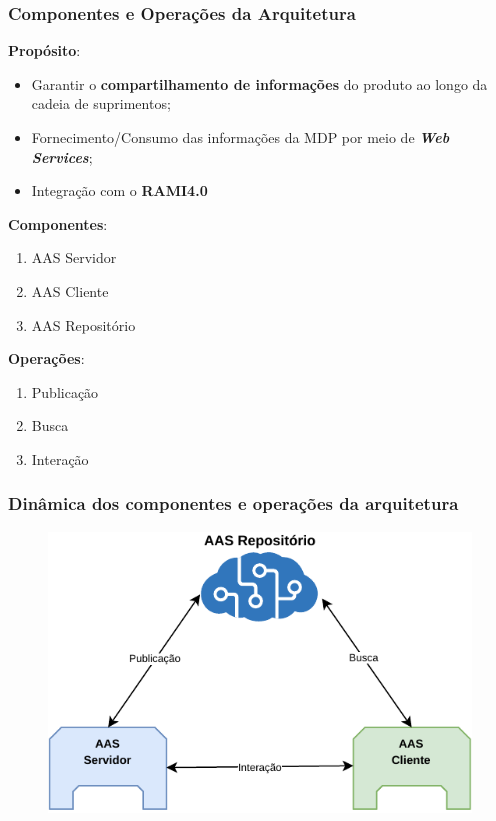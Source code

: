 \documentclass[10pt]{beamer}
\begin{document}
\begin{frame}
	\frametitle{Componentes e Operações da Arquitetura}
	
	\textbf{Propósito}:
	
	\begin{itemize}
		\item Garantir o \textbf{compartilhamento de informações} do produto ao longo da cadeia de suprimentos;
		\item Fornecimento/Consumo das informações da MDP por meio de \textit{\textbf{Web Services}};
		\item Integração com o \textbf{RAMI4.0}
	\end{itemize}

	\bigskip

	\begin{minipage}{.5\linewidth}
		\textbf{Componentes}:
		\begin{enumerate}
			\item AAS Servidor
			\item AAS Cliente
			\item AAS Repositório
		\end{enumerate}
	\end{minipage}%
	\begin{minipage}{.5\linewidth}
		\textbf{Operações}:
		\begin{enumerate}
			\item Publicação
			\item Busca
			\item Interação
		\end{enumerate}
	\end{minipage}

\end{frame}
\begin{frame}
	\frametitle{Dinâmica dos componentes e operações da arquitetura}
	
	\begin{figure}[htb]
		\centering
		\label{fig:aas-ws}
		\includegraphics[width=1\textwidth]{aas-ws}
	\end{figure}
	
\end{frame}
\end{document}
